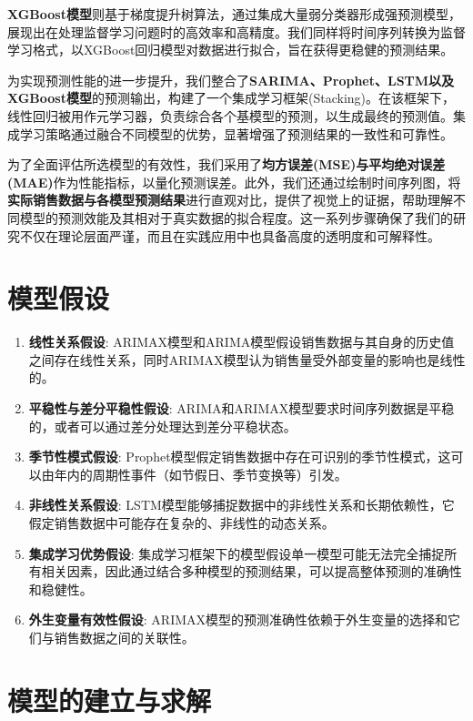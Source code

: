 \documentclass[a4paper]{article}
\begin{document}
\textbf{XGBoost模型}则基于梯度提升树算法，通过集成大量弱分类器形成强预测模型，展现出在处理监督学习问题时的高效率和高精度。我们同样将时间序列转换为监督学习格式，以XGBoost回归模型对数据进行拟合，旨在获得更稳健的预测结果。

为实现预测性能的进一步提升，我们整合了\textbf{SARIMA、Prophet、LSTM以及XGBoost模型}的预测输出，构建了一个集成学习框架(Stacking)。在该框架下，线性回归被用作元学习器，负责综合各个基模型的预测，以生成最终的预测值。集成学习策略通过融合不同模型的优势，显著增强了预测结果的一致性和可靠性。

为了全面评估所选模型的有效性，我们采用了\textbf{均方误差(MSE)与平均绝对误差(MAE)}作为性能指标，以量化预测误差。此外，我们还通过绘制时间序列图，将\textbf{实际销售数据与各模型预测结果}进行直观对比，提供了视觉上的证据，帮助理解不同模型的预测效能及其相对于真实数据的拟合程度。这一系列步骤确保了我们的研究不仅在理论层面严谨，而且在实践应用中也具备高度的透明度和可解释性。

	\section{模型假设}
	
	\begin{enumerate}
		\item \textbf{线性关系假设}: ARIMAX模型和ARIMA模型假设销售数据与其自身的历史值之间存在线性关系，同时ARIMAX模型认为销售量受外部变量的影响也是线性的。
		\item \textbf{平稳性与差分平稳性假设}: ARIMA和ARIMAX模型要求时间序列数据是平稳的，或者可以通过差分处理达到差分平稳状态。
		\item \textbf{季节性模式假设}: Prophet模型假定销售数据中存在可识别的季节性模式，这可以由年内的周期性事件（如节假日、季节变换等）引发。
		\item \textbf{非线性关系假设}: LSTM模型能够捕捉数据中的非线性关系和长期依赖性，它假定销售数据中可能存在复杂的、非线性的动态关系。
		\item \textbf{集成学习优势假设}: 集成学习框架下的模型假设单一模型可能无法完全捕捉所有相关因素，因此通过结合多种模型的预测结果，可以提高整体预测的准确性和稳健性。
		\item \textbf{外生变量有效性假设}: ARIMAX模型的预测准确性依赖于外生变量的选择和它们与销售数据之间的关联性。
	\end{enumerate}

	\section{模型的建立与求解}  
\end{document}
